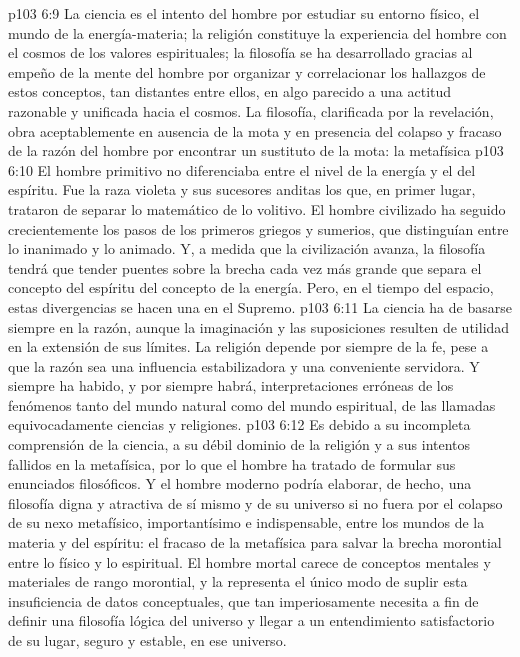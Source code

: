 \vs p103 6:9 La ciencia es el intento del hombre por estudiar su entorno físico, el mundo de la energía\hyp{}materia; la religión constituye la experiencia del hombre con el cosmos de los valores espirituales; la filosofía se ha desarrollado gracias al empeño de la mente del hombre por organizar y correlacionar los hallazgos de estos conceptos, tan distantes entre ellos, en algo parecido a una actitud razonable y unificada hacia el cosmos. La filosofía, clarificada por la revelación, obra aceptablemente en ausencia de la mota y en presencia del colapso y fracaso de la razón del hombre por encontrar un sustituto de la mota: la metafísica
\vs p103 6:10 \pc El hombre primitivo no diferenciaba entre el nivel de la energía y el del espíritu. Fue la raza violeta y sus sucesores anditas los que, en primer lugar, trataron de separar lo matemático de lo volitivo. El hombre civilizado ha seguido crecientemente los pasos de los primeros griegos y sumerios, que distinguían entre lo inanimado y lo animado. Y, a medida que la civilización avanza, la filosofía tendrá que tender puentes sobre la brecha cada vez más grande que separa el concepto del espíritu del concepto de la energía. Pero, en el tiempo del espacio, estas divergencias se hacen una en el Supremo.
\vs p103 6:11 \pc La ciencia ha de basarse siempre en la razón, aunque la imaginación y las suposiciones resulten de utilidad en la extensión de sus límites. La religión depende por siempre de la fe, pese a que la razón sea una influencia estabilizadora y una conveniente servidora. Y siempre ha habido, y por siempre habrá, interpretaciones erróneas de los fenómenos tanto del mundo natural como del mundo espiritual, de las llamadas equivocadamente ciencias y religiones.
\vs p103 6:12 Es debido a su incompleta comprensión de la ciencia, a su débil dominio de la religión y a sus intentos fallidos en la metafísica, por lo que el hombre ha tratado de formular sus enunciados filosóficos. Y el hombre moderno podría elaborar, de hecho, una filosofía digna y atractiva de sí mismo y de su universo si no fuera por el colapso de su nexo metafísico, importantísimo e indispensable, entre los mundos de la materia y del espíritu: el fracaso de la metafísica para salvar la brecha morontial entre lo físico y lo espiritual. El hombre mortal carece de conceptos mentales y materiales de rango morontial, y la  representa el único modo de suplir esta insuficiencia de datos conceptuales, que tan imperiosamente necesita a fin de definir una filosofía lógica del universo y llegar a un entendimiento satisfactorio de su lugar, seguro y estable, en ese universo.
